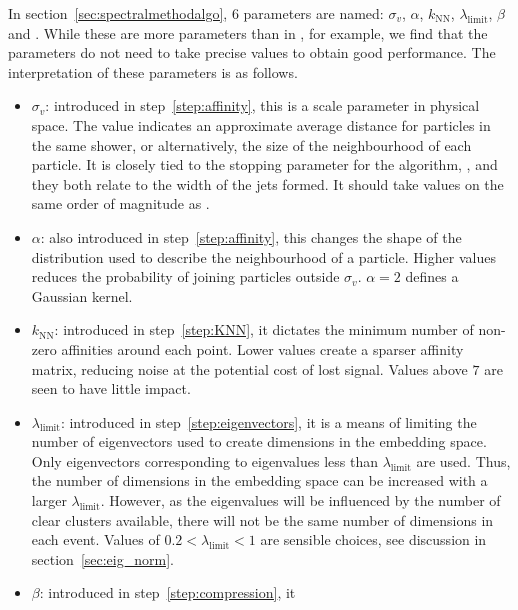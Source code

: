 In section~\ref{sec:spectralmethodalgo}, 6 parameters are named:
\(\sigma_v\), \(\alpha\), \(k_\text{NN}\), \(\lambda_\text{limit}\), \(\beta\) and \stoppingdeltar{}.
While these are more parameters than in \genkt{}, for example,
we find that the parameters do not need to take precise values
to obtain good performance.
The interpretation of these parameters is as follows.
\begin{itemize}
    \item \(\sigma_v\): introduced in step~\ref{step:affinity}, this is a scale parameter in physical space.
                      The value indicates an approximate average distance for particles in the same shower,
                      or alternatively, the size of the neighbourhood of each particle.
                      It is closely tied to the stopping parameter for the \genkt{} algorithm,
                      \ktstoppingdeltar{},
                      and they both relate to the width of the jets formed.
                      It should take values on the same order of magnitude as \ktstoppingdeltar{}.
    \item  \(\alpha\): also introduced in step~\ref{step:affinity},
           this changes the shape of the distribution used to describe the neighbourhood of a particle.
           Higher values reduces the probability of joining particles outside \(\sigma_v\). 
           \(\alpha=2\) defines a Gaussian kernel.
       \item \(k_\text{NN}\): introduced in step~\ref{step:KNN}, it dictates the minimum number of non-zero affinities around each point.
           Lower values create a sparser affinity matrix, reducing noise at the potential cost of lost signal.
           Values above \(7\) are seen to have little impact.
       \item  \(\lambda_\text{limit}\): introduced in step~\ref{step:eigenvectors}, it is a means of limiting the number of eigenvectors used
           to create dimensions in the embedding space.
           Only eigenvectors corresponding to eigenvalues less than \(\lambda_\text{limit}\) are used.
           Thus, the number of dimensions in the embedding space can be increased with a larger \(\lambda_\text{limit}\). 
           However, as the eigenvalues will be influenced by the number of clear clusters available, 
           there will not be the same number of dimensions in each event.
           Values of \(0.2 <\lambda_\text{limit} < 1\) are sensible choices,
           see discussion in section~\ref{sec:eig_norm}.
       \item  \(\beta\): introduced in step~\ref{step:compression}, it 

\end{itemize}

